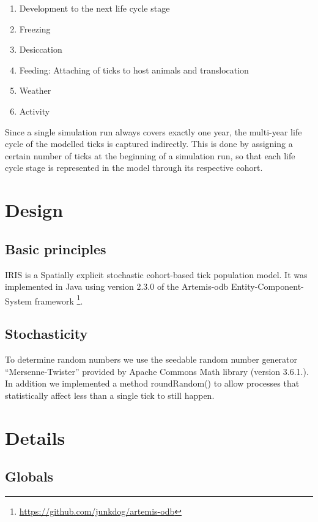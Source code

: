 \documentclass[a4paper, 11pt]{scrartcl}
\begin{document}
\begin{enumerate}
	\item Development to the next life cycle stage
	\item Freezing
	\item Desiccation
	\item Feeding: Attaching of ticks to host animals and translocation
	\item Weather
	\item Activity
\end{enumerate}

Since a single simulation run always covers exactly one year, the multi-year life cycle of the modelled ticks is captured indirectly.
This is done by assigning a certain number of ticks at the beginning of a simulation run, so that each life cycle stage is represented in
the model through its respective cohort.


\newpage
\section{Design}


\subsection{Basic principles}
IRIS is a Spatially explicit stochastic cohort-based tick population model. It was implemented in Java using version 2.3.0 of the Artemis-odb Entity-Component-System framework
\footnote{\url{https://github.com/junkdog/artemis-odb}}.

\subsection{Stochasticity}\label{subsec:stochasticity}
To determine random numbers we use the seedable random number generator ``Mersenne-Twister'' provided by Apache Commons Math library
(version 3.6.1.). In addition we implemented a method roundRandom() to allow processes that statistically affect less than
a single tick to still happen.


\newpage
\section{Details}

\subsection{Globals}
\end{document}

